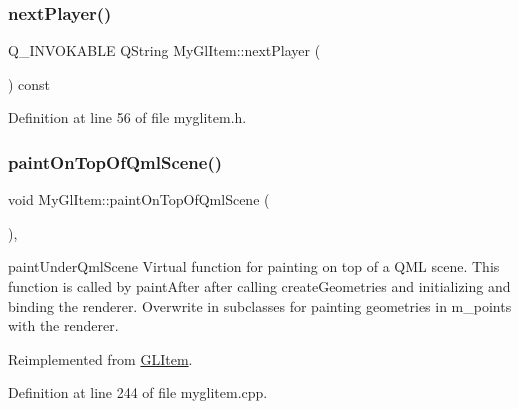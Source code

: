 \mbox{\label{class_my_gl_item_a32e2b4ee36ad4c6e350e6faaa3f785ec}} 
\subsubsection{\texorpdfstring{nextPlayer()}{nextPlayer()}}
{\footnotesize\ttfamily Q\+\_\+\+I\+N\+V\+O\+K\+A\+B\+LE Q\+String My\+Gl\+Item\+::next\+Player (\begin{DoxyParamCaption}{ }\end{DoxyParamCaption}) const\hspace{0.3cm}{\ttfamily [inline]}}



Definition at line 56 of file myglitem.\+h.

\mbox{\label{class_my_gl_item_ad9f060b5a805367e0fbf065e9318c0b1}} 
\subsubsection{\texorpdfstring{paintOnTopOfQmlScene()}{paintOnTopOfQmlScene()}}
{\footnotesize\ttfamily void My\+Gl\+Item\+::paint\+On\+Top\+Of\+Qml\+Scene (\begin{DoxyParamCaption}{ }\end{DoxyParamCaption})\hspace{0.3cm}{\ttfamily [override]}, {\ttfamily [virtual]}}



paint\+Under\+Qml\+Scene Virtual function for painting on top of a Q\+ML scene. This function is called by paint\+After after calling create\+Geometries and initializing and binding the renderer. Overwrite in subclasses for painting geometries in m\+\_\+points with the renderer. 



Reimplemented from \mbox{\hyperlink{class_g_l_item_a595830cf6ae5434a253c68366275b65d}{G\+L\+Item}}.



Definition at line 244 of file myglitem.\+cpp.

\mbox{\label{class_my_gl_item_a46ffc33e9892262f9d1d88c14fa0e092}} 
